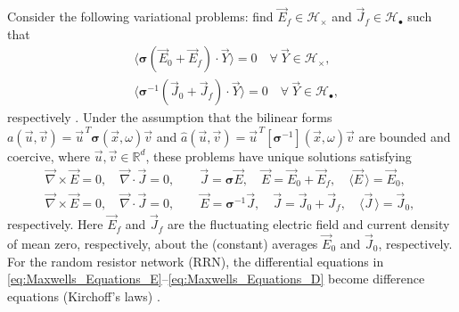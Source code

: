 \documentclass[english,12pt,jmp,graphicx]{revtex4-1}
\begin{document}
Consider the following variational problems: 
find $\vec{E}_f\in\mathscr{H}_\times$ and  $\vec{J}_f\in \mathscr{H}_{\bullet}$ such
that    
%
\begin{align}
  \label{eq:Weak_Curl_Free_Variational_Form}
 &\langle\bm{\sigma}(\vec{E}_0+\vec{E}_f)\cdot\vec{Y}\rangle=0 \quad  \forall \
  \vec{Y}\in\mathscr{H}_\times,\\
%
  \label{eq:Weak_Div_Free_Variational_Form}
 &\langle\bm{\sigma}^{-1}(\vec{J}_0+\vec{J}_f)\cdot\vec{Y}\rangle=0 \quad  \forall \
  \vec{Y}\in\mathscr{H}_{\bullet},  
\end{align}
%
respectively \cite{Golden:CMP-473}. Under the assumption that the
bilinear forms
$a(\vec{u},\vec{v})=\vec{u}^{\,T}\bm{\sigma}(\vec{x},\omega)\vec{v}$ and
$\hat{a}(\vec{u},\vec{v})=\vec{u}^{\,T}[\bm{\sigma}^{-1}](\vec{x},\omega)\vec{v}$
are bounded and coercive, where $\vec{u},\vec{v}\in\mathbb{R}^d$, these
problems have unique solutions satisfying \cite{Golden:CMP-473} 
%
\begin{align}
  \label{eq:Maxwells_Equations_E}  
  &\vec{\nabla}\times\vec{E}=0, \quad
  \vec{\nabla}\cdot\vec{J}=0,\qquad 
  \vec{J}=\bm{\sigma}\vec{E},\quad
  \vec{E}=\vec{E}_0+\vec{E}_f, \quad
  \langle\vec{E}\,\rangle=\vec{E}_0,\\
%
  \label{eq:Maxwells_Equations_D}
   &\vec{\nabla}\times\vec{E}=0, \quad
   \vec{\nabla}\cdot\vec{J}=0, \qquad
   \vec{E}=\bm{\sigma}^{-1}\vec{J},\quad   
   \vec{J}=\vec{J}_0+\vec{J}_f,\quad
   \langle\vec{J}\,\rangle=\vec{J}_0,\quad
\end{align}
%
respectively. Here $\vec{E}_f$ and $\vec{J}_f$ are the fluctuating
electric field and current density of mean zero, respectively, about the
(constant) averages $\vec{E}_0$ and $\vec{J}_0$, respectively. For the random
resistor network (RRN), the differential equations in
\eqref{eq:Maxwells_Equations_E}--\eqref{eq:Maxwells_Equations_D} 
become difference equations (Kirchoff's laws)
\cite{Golden:CMP-467,Golden:JMP-5627}.   
\end{document}

